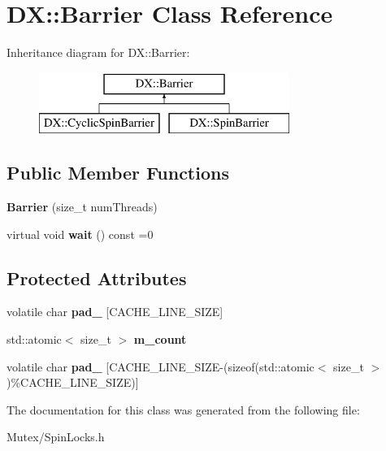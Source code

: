 \hypertarget{class_d_x_1_1_barrier}{\section{D\-X\-:\-:Barrier Class Reference}
\label{class_d_x_1_1_barrier}
}
Inheritance diagram for D\-X\-:\-:Barrier\-:\begin{figure}[H]
\begin{center}
\leavevmode
\includegraphics[height=2.000000cm]{class_d_x_1_1_barrier}
\end{center}
\end{figure}
\subsection*{Public Member Functions}
\begin{DoxyCompactItemize}
\item 
\hypertarget{class_d_x_1_1_barrier_ae7a881ba86bd4f16a25600f00457e710}{{\bfseries Barrier} (size\-\_\-t num\-Threads)}\label{class_d_x_1_1_barrier_ae7a881ba86bd4f16a25600f00457e710}

\item 
\hypertarget{class_d_x_1_1_barrier_a34b9c56a632e7ace41532794ff98694d}{virtual void {\bfseries wait} () const =0}\label{class_d_x_1_1_barrier_a34b9c56a632e7ace41532794ff98694d}

\end{DoxyCompactItemize}
\subsection*{Protected Attributes}
\begin{DoxyCompactItemize}
\item 
\hypertarget{class_d_x_1_1_barrier_a1e6b00a5eb4aa2a83bb3e4b50c44b87f}{volatile char {\bfseries pad\-\_\-} \mbox{[}C\-A\-C\-H\-E\-\_\-\-L\-I\-N\-E\-\_\-\-S\-I\-Z\-E\mbox{]}}\label{class_d_x_1_1_barrier_a1e6b00a5eb4aa2a83bb3e4b50c44b87f}

\item 
\hypertarget{class_d_x_1_1_barrier_ad9ffd4f0c093bfa7018fd836e4b7d681}{std\-::atomic$<$ size\-\_\-t $>$ {\bfseries m\-\_\-count}}\label{class_d_x_1_1_barrier_ad9ffd4f0c093bfa7018fd836e4b7d681}

\item 
\hypertarget{class_d_x_1_1_barrier_aa3a626f3a98219fe1cd37bfcb731a1fc}{volatile char {\bfseries pad\-\_} \mbox{[}C\-A\-C\-H\-E\-\_\-\-L\-I\-N\-E\-\_\-\-S\-I\-Z\-E-\/(sizeof(std\-::atomic$<$ size\-\_\-t $>$)\%C\-A\-C\-H\-E\-\_\-\-L\-I\-N\-E\-\_\-\-S\-I\-Z\-E)\mbox{]}}\label{class_d_x_1_1_barrier_aa3a626f3a98219fe1cd37bfcb731a1fc}

\end{DoxyCompactItemize}


The documentation for this class was generated from the following file\-:\begin{DoxyCompactItemize}
\item 
Mutex/Spin\-Locks.\-h\end{DoxyCompactItemize}
